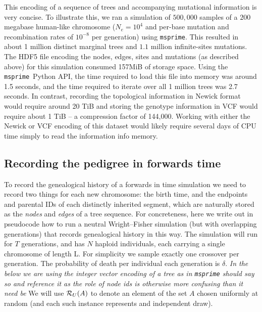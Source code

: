 \documentclass{article}
\newcommand{\msprime}{\texttt{msprime}}
\newcommand{\jda}[1]{{\em \color{cyan} #1}}
\begin{document}
This encoding of a sequence of trees and accompanying mutational information is
very concise. To illustrate this, we ran a simulation of $500,000$ samples of a
$200$ megabase human-like chromosome ($N_e=10^4$ and per-base mutation and
recombination rates of $10^{-8}$ per generation) using \msprime. This resulted
in about 1 million distinct marginal trees and $1.1$ million infinite-sites
mutations. The HDF5 file encoding the nodes, edges, sites and mutations (as
described above) for this simulation consumed 157MiB of storage space. Using
the \msprime\ Python API, the time required to load this file into memory was
around 1.5 seconds, and the time required to iterate over all 1 million trees
was 2.7 seconds. In contrast, recording the topological information in Newick
format would require around 20 TiB and storing the genotype information
in VCF would require about 1 TiB --
a compression factor of 144,000.
Working with either the Newick or VCF encoding
of this dataset would likely require several
days of CPU time simply to read the information info memory.


\subsection*{Recording the pedigree in forwards time}

To record the genealogical history of a forwards in time simulation
we need to record two things for each new chromosome:
the birth time, and the endpoints and parental IDs of each distinctly inherited segment,
which are naturally stored as the \emph{nodes} and \emph{edges} of a tree sequence.
For concreteness, here we write out in pseudocode how to run a neutral Wright--Fisher simulation
(but with overlapping generations) that records genealogical history in this way.
The simulation will run for $T$ generations,
and has $N$ haploid individuals, each carrying a single chromosome of length L.
For simplicity we sample exactly one crossover per generation.
The probability of death per individual each generation is $\delta$.
\jda{In the below we are using the integer vector encoding of a tree as in
	\msprime{} should say so and reference it as the role of node ids is
	otherwise more confusing than it need be}
We will use
$\mathcal{R}_U(A)$ to denote an element of the set $A$ chosen uniformly at random 
(and each such instance represents and independent draw).
\end{document}

